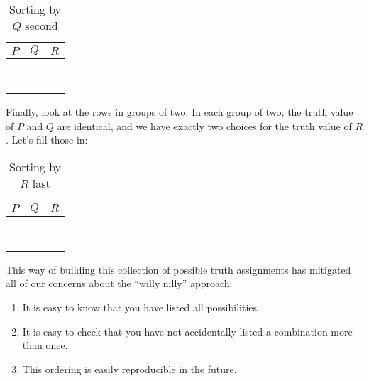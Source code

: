 		\begin{table}[h!]
	\begin{center}
		\caption{Sorting by $Q$ second}
		\begin{tabular}{c|c|c} 
			$P$ & $Q$ & $R$ \\
			\hline
			\F & \F &  \\  \hline
			\F & \F &  \\  \hline
			\F & \T &  \\  \hline
			\F & \T &  \\  \hline
			\T & \F &  \\  \hline
			\T & \F &  \\  \hline
			\T & \T &  \\  \hline
			\T & \T  &  \\  \hline
		\end{tabular}
	\end{center}
\end{table}

Finally, look at the rows in groups of two.  In each group of two, the truth value of $P$ and $Q$ are identical, and we have exactly two choices for the truth value of $R$.  Let's fill those in:


		\begin{table}[h!]
	\begin{center}
		\caption{Sorting by $R$ last}
		\begin{tabular}{c|c|c} 
			$P$ & $Q$ & $R$ \\
			\hline
			\F & \F & \F  \\  \hline
			\F & \F & \T \\  \hline
			\F & \T & \F \\  \hline
			\F & \T & \T \\  \hline
			\T & \F & \F \\  \hline
			\T & \F &  \T\\  \hline
			\T & \T &  \F\\  \hline
			\T & \T  &  \T \\  \hline
		\end{tabular}
	\end{center}
\end{table}

This way of building this collection of possible truth assignments has mitigated all of our concerns about the ``willy nilly'' approach:

\begin{enumerate}
	\item It is easy to know that you have listed all possibilities.
	\item It is easy to check that you have not accidentally listed a combination more than once.
	\item This ordering is easily reproducible in the future.
\end{enumerate}


